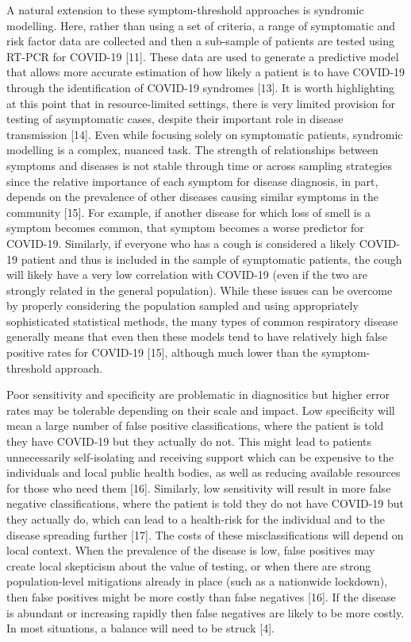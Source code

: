 \documentclass[]{elsarticle} %
\begin{document}
A natural extension to these symptom-threshold approaches is syndromic
modelling. Here, rather than using a set of criteria, a range of
symptomatic and risk factor data are collected and then a sub-sample of
patients are tested using RT-PCR for COVID-19 {[}11{]}. These data are
used to generate a predictive model that allows more accurate estimation
of how likely a patient is to have COVID-19 through the identification
of COVID-19 syndromes {[}13{]}. It is worth highlighting at this point
that in resource-limited settings, there is very limited provision for
testing of asymptomatic cases, despite their important role in disease
transmission {[}14{]}. Even while focusing solely on symptomatic
patients, syndromic modelling is a complex, nuanced task. The strength
of relationships between symptoms and diseases is not stable through
time or across sampling strategies since the relative importance of each
symptom for disease diagnosis, in part, depends on the prevalence of
other diseases causing similar symptoms in the community {[}15{]}. For
example, if another disease for which loss of smell is a symptom becomes
common, that symptom becomes a worse predictor for COVID-19. Similarly,
if everyone who has a cough is considered a likely COVID-19 patient and
thus is included in the sample of symptomatic patients, the cough will
likely have a very low correlation with COVID-19 (even if the two are
strongly related in the general population). While these issues can be
overcome by properly considering the population sampled and using
appropriately sophisticated statistical methods, the many types of
common respiratory disease generally means that even then these models
tend to have relatively high false positive rates for COVID-19 {[}15{]},
although much lower than the symptom-threshold approach.

Poor sensitivity and specificity are problematic in diagnositics but
higher error rates may be tolerable depending on their scale and impact.
Low specificity will mean a large number of false positive
classifications, where the patient is told they have COVID-19 but they
actually do not. This might lead to patients unnecessarily
self-isolating and receiving support which can be expensive to the
individuals and local public health bodies, as well as reducing
available resources for those who need them {[}16{]}. Similarly, low
sensitivity will result in more false negative classifications, where
the patient is told they do not have COVID-19 but they actually do,
which can lead to a health-risk for the individual and to the disease
spreading further {[}17{]}. The costs of these misclassifications will
depend on local context. When the prevalence of the disease is low,
false positives may create local skepticism about the value of testing,
or when there are strong population-level mitigations already in place
(such as a nationwide lockdown), then false positives might be more
costly than false negatives {[}16{]}. If the disease is abundant or
increasing rapidly then false negatives are likely to be more costly. In
most situations, a balance will need to be struck {[}4{]}.
\end{document}
